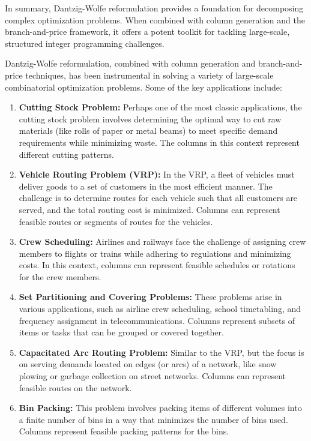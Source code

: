 In summary, Dantzig-Wolfe reformulation provides a foundation for decomposing complex optimization problems. When combined with column generation and the branch-and-price framework, it offers a potent toolkit for tackling large-scale, structured integer programming challenges.


Dantzig-Wolfe reformulation, combined with column generation and branch-and-price techniques, has been instrumental in solving a variety of large-scale combinatorial optimization problems. Some of the key applications include:

\begin{enumerate}
    \item \textbf{Cutting Stock Problem:} Perhaps one of the most classic applications, the cutting stock problem involves determining the optimal way to cut raw materials (like rolls of paper or metal beams) to meet specific demand requirements while minimizing waste. The columns in this context represent different cutting patterns.
    
    \item \textbf{Vehicle Routing Problem (VRP):} In the VRP, a fleet of vehicles must deliver goods to a set of customers in the most efficient manner. The challenge is to determine routes for each vehicle such that all customers are served, and the total routing cost is minimized. Columns can represent feasible routes or segments of routes for the vehicles.
    
    \item \textbf{Crew Scheduling:} Airlines and railways face the challenge of assigning crew members to flights or trains while adhering to regulations and minimizing costs. In this context, columns can represent feasible schedules or rotations for the crew members.
    
    \item \textbf{Set Partitioning and Covering Problems:} These problems arise in various applications, such as airline crew scheduling, school timetabling, and frequency assignment in telecommunications. Columns represent subsets of items or tasks that can be grouped or covered together.
    
    \item \textbf{Capacitated Arc Routing Problem:} Similar to the VRP, but the focus is on serving demands located on edges (or arcs) of a network, like snow plowing or garbage collection on street networks. Columns can represent feasible routes on the network.
    
    \item \textbf{Bin Packing:} This problem involves packing items of different volumes into a finite number of bins in a way that minimizes the number of bins used. Columns represent feasible packing patterns for the bins.
\end{enumerate}

